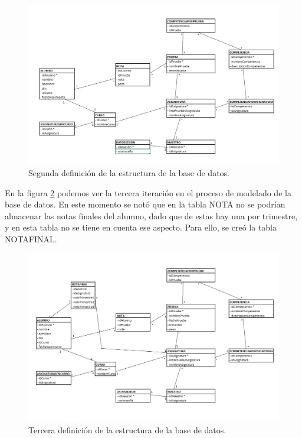 \begin{figure}[H]
\centering\includegraphics[width=1\linewidth]{figs/DB_Definition_2.png}
\caption{Segunda definición de la estructura de la base de datos.}
\label{Fig:ADB_Definition_2}
\end{figure}

\newpage
En la figura \ref{Fig:ADB_Definition_3} podemos ver la tercera iteración en el proceso de modelado de la base de datos. En este momento se notó que en la tabla NOTA no se podrían almacenar las notas finales del alumno, dado que de estas hay una por trimestre, y en esta tabla no se tiene en cuenta ese aspecto. Para ello, se creó la tabla NOTAFINAL.

\begin{figure}[H]
\centering\includegraphics[width=1\linewidth]{figs/DB_Definition_3.png}
\caption{Tercera definición de la estructura de la base de datos.}
\label{Fig:ADB_Definition_3}
\end{figure}

